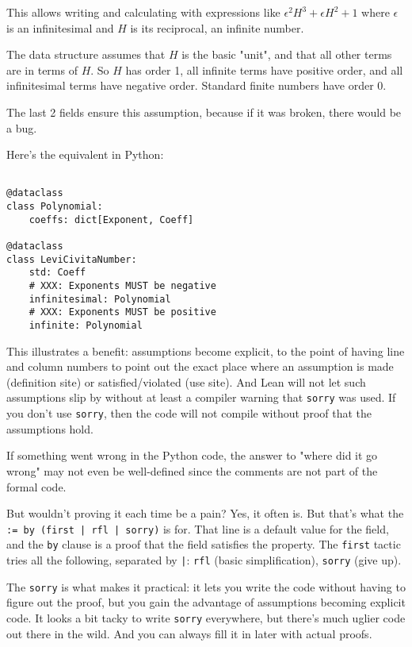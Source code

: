\documentclass{article}
\begin{document}
This allows writing and calculating with expressions like $\epsilon^2 H^3 + \epsilon H^2 + 1$ where $\epsilon$ is an infinitesimal and $H$ is its reciprocal, an infinite number.

The data structure assumes that $H$ is the basic "unit", and that all other terms are in terms of $H$. So $H$ has order 1, all infinite terms have positive order, and all infinitesimal terms have negative order. Standard finite numbers have order 0.

The last 2 fields ensure this assumption, because if it was broken, there would be a bug.

Here's the equivalent in Python:

\begin{verbatim}

@dataclass
class Polynomial:
    coeffs: dict[Exponent, Coeff]

@dataclass
class LeviCivitaNumber:
    std: Coeff
    # XXX: Exponents MUST be negative
    infinitesimal: Polynomial
    # XXX: Exponents MUST be positive
    infinite: Polynomial
\end{verbatim}

This illustrates a benefit: assumptions become explicit, to the point of having line and column numbers to point out the exact place where an assumption is made (definition site) or satisfied/violated (use site). And Lean will not let such assumptions slip by without at least a compiler warning that \texttt{sorry} was used. If you don't use \texttt{sorry}, then the code will not compile without proof that the assumptions hold.

If something went wrong in the Python code, the answer to "where did it go wrong" may not even be well-defined since the comments are not part of the formal code.

But wouldn't proving it each time be a pain? Yes, it often is. But that's what the \texttt{:= by (first | rfl | sorry)} is for. That line is a default value for the field, and the \texttt{by} clause is a proof that the field satisfies the property. The \texttt{first} tactic tries all the following, separated by \texttt{|}: \texttt{rfl} (basic simplification), \texttt{sorry} (give up).

The \texttt{sorry} is what makes it practical: it lets you write the code without having to figure out the proof, but you gain the advantage of assumptions becoming explicit code. It looks a bit tacky to write \texttt{sorry} everywhere, but there's much uglier code out there in the wild. And you can always fill it in later with actual proofs.
\end{document}
